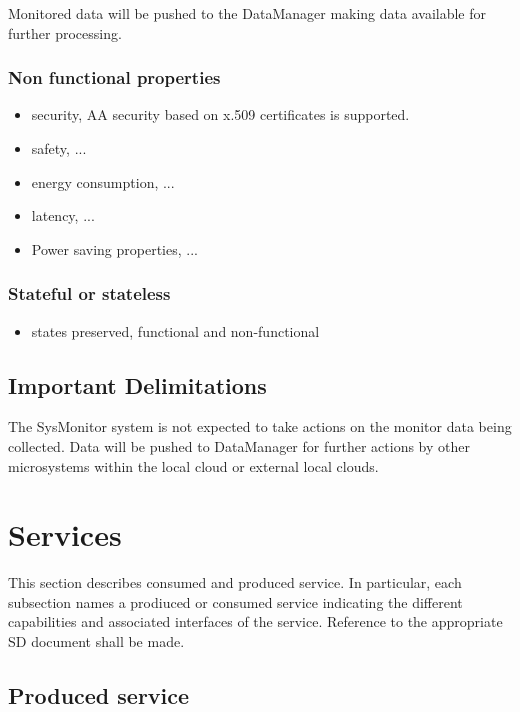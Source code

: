 \documentclass[a4paper]{arrowhead}
\begin{document}
Monitored data will be pushed to the DataManager making data available
for further processing.  

\subsubsection {Non functional properties}
\begin{itemize}
  \item security, AA security based on x.509 certificates is supported. 
  \item safety, ...
  \item energy consumption,  ...
  \item latency,  ...
  \item Power saving properties,  ... 
\end{itemize}


\subsubsection {Stateful or stateless}
\begin{itemize} 
\item states preserved, functional and non-functional
\end{itemize}  


\subsection{Important Delimitations}
\label{sec:delimitations}

The SysMonitor system is not expected to take actions on the monitor data
being collected. Data will be pushed to DataManager for further
actions by other microsystems within the local cloud or external local clouds.



\section{Services}
\label{sec:services}

This section describes consumed and produced service.
In particular, each subsection names a prodiuced or consumed service
indicating the different capabilities and associated interfaces of the
service. Reference to the appropriate SD document shall be made.

\subsection{Produced service}
\end{document}
